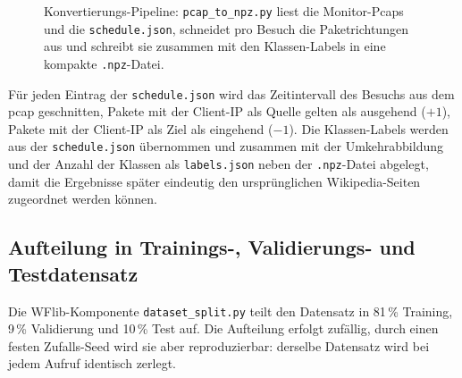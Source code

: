 \begin{figure}[H]
\centering
{}
\caption{Konvertierungs-Pipeline: \texttt{pcap\_to\_npz.py} liest die Monitor-Pcaps und die \texttt{schedule.json}, schneidet pro Besuch die Paketrichtungen aus und schreibt sie zusammen mit den Klassen-Labels in eine kompakte \texttt{.npz}-Datei.}
\label{fig:datapipeline}
\end{figure}

Für jeden Eintrag der \texttt{schedule.json} wird das Zeitintervall des Besuchs aus dem \gls{pcap} geschnitten, Pakete mit der Client-IP als Quelle gelten als ausgehend ($+1$), Pakete mit der Client-IP als Ziel als eingehend ($-1$).
Die Klassen-Labels werden aus der \texttt{schedule.json} übernommen und zusammen mit der Umkehrabbildung und der Anzahl der Klassen als \texttt{labels.json} neben der \texttt{.npz}-Datei abgelegt, damit die Ergebnisse später eindeutig den ursprünglichen Wikipedia-Seiten zugeordnet werden können.

\subsection{Aufteilung in Trainings-, Validierungs- und Testdatensatz}

Die WFlib-Komponente \texttt{dataset\_split.py} teilt den Datensatz in 81\,\% Training, 9\,\% Validierung und 10\,\% Test auf.
Die Aufteilung erfolgt zufällig, durch einen festen Zufalls-Seed wird sie aber reproduzierbar: derselbe Datensatz wird bei jedem Aufruf identisch zerlegt.
